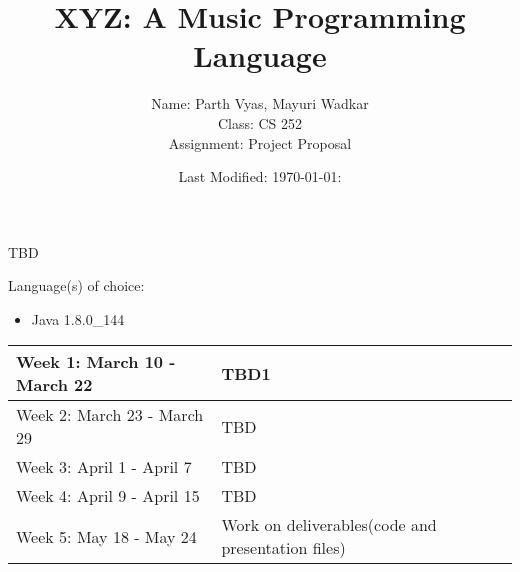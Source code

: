 \documentclass{article}
\title{XYZ: A Music Programming Language}
\author {
  Name:  Parth Vyas, Mayuri Wadkar\\
  Class: CS 252 \\
  Assignment: Project Proposal \\
}
\date{Last Modified: {\today}:{\currenttime}}
\begin{document}
    \maketitle

    \begin{flushleft}
    {
     	TBD
    }  
    \end{flushleft}

    \begin{flushleft}
      {
        
        Language(s) of choice:
        \begin{itemize}
          \item Java 1.8.0\_144
         
        \end{itemize}
      }
    \end{flushleft}
    {
      \newcommand{\schedule}[2]{
        \hline
        #1 & #2
        \\
        \hline
      }

      \begin{center}
        \begin{table}[!th]
          \begin{tabular}{|L|L|}
            \schedule{Week 1: March 10 - March 22}{TBD1}
            \schedule{Week 2: March 23 - March 29}{TBD}
            \schedule{Week 3: April 1 - April 7}{TBD}
            \schedule{Week 4: April 9 - April 15}{TBD}
            \schedule{Week 5: May 18 - May 24}{Work on deliverables(code and presentation files)}
          \end{tabular}
        \end{table}  
      \end{center}
    }

    \nocite{SJonesBeautifulConcc}
    {}
    
\end{document}
